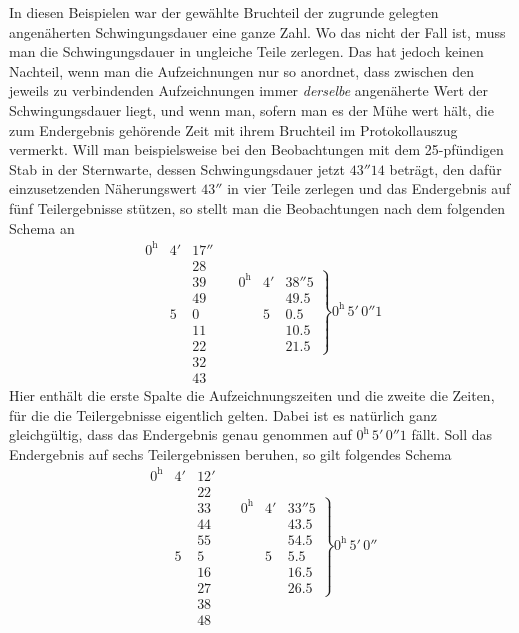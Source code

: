 In diesen Beispielen war der gewählte Bruchteil der zugrunde gelegten angenäherten Schwingungsdauer eine ganze Zahl. Wo das nicht der Fall ist, muss man die Schwingungsdauer in ungleiche Teile zerlegen. Das hat jedoch keinen Nachteil, wenn man die Aufzeichnungen nur so anordnet, dass zwischen den jeweils zu verbindenden Aufzeichnungen immer \textit{derselbe} angenäherte Wert der Schwingungsdauer liegt, und wenn man, sofern man es der Mühe wert hält, die zum Endergebnis gehörende Zeit mit ihrem Bruchteil im Protokollauszug vermerkt. Will man beispielsweise bei den Beobachtungen mit dem 25-pfündigen Stab in der Sternwarte, dessen Schwingungsdauer jetzt $43''14$ beträgt, den dafür einzusetzenden Näherungswert $43''$ in vier Teile zerlegen und das Endergebnis auf fünf Teilergebnisse stützen, so stellt man die Beobachtungen nach dem folgenden Schema an
\[
\begin{array}{rrr|}
0^{\mathrm h}&4'&17''\\
&&28\\
&&39\\
&&49\\
&5&0\\
&&11\\
&&22\\
&&32\\
&&43
\end{array}\quad
\left.\begin{array}{rrr}0^{\mathrm h}&4'&38''5\\&&49.5\\&5&0.5\\&&10.5\\&&21.5\end{array}\right\}0^{\mathrm h}\,5'\,0''1
\]
Hier enthält die erste Spalte die Aufzeichnungszeiten und die zweite die Zeiten, für die die Teilergebnisse eigentlich gelten. Dabei ist es natürlich
ganz gleichgültig, dass das Endergebnis genau genommen auf $0^{\mathrm h}\,5'\,0''1$ fällt. Soll das Endergebnis auf sechs Teilergebnissen beruhen, so gilt folgendes Schema
\[
\begin{array}{rrr|}
0^{\mathrm h}&4'&12'\\
&&22\\
&&33\\
&&44\\
&&55\\
&5&5\\
&&16\\
&&27\\
&&38\\
&&48
\end{array}\quad
\left.\begin{array}{rrr}0^{\mathrm h}&4'&33''5\\&&43.5\\&&54.5\\&5&5.5\\&&16.5\\&&26.5\end{array}\right\}0^{\mathrm h}\,5'\,0''
\]

